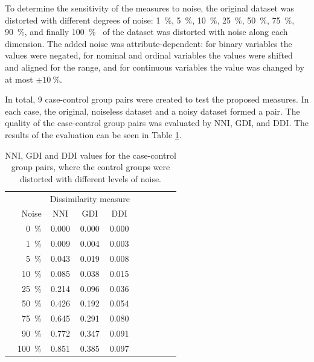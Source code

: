 	To determine the sensitivity of the measures to noise, the original dataset was distorted with different degrees of noise: \SI{1}{\percent}, \SI{5}{\percent}, \SI{10}{\percent}, \SI{25}{\percent}, \SI{50}{\percent}, \SI{75}{\percent}, \SI{90}{\percent},  and finally \SI{100}{\percent} \ of the dataset was distorted with noise along each dimension. The added noise was attribute-dependent: for binary variables the values were negated, for nominal and ordinal variables the values were shifted and aligned for the range, and for continuous variables the value was changed by at most $\pm\SI{10}{\percent}$.
				
	In total, 9 case-control group pairs were created to test the proposed measures. In each case, the original, noiseless dataset and a noisy dataset formed a pair. The quality of the case-control group pairs was evaluated by NNI, GDI, and DDI. The results of the evaluation can be seen in Table \ref{tab:result1}.
				
	\begin{table}[h]
		\centering
		\caption{NNI, GDI and DDI values for the case-control group pairs, where the control groups were distorted with different levels of noise.}\label{tab:result1}
		\bgroup
		\def\arraystretch{1.4}
		\begin{tabular}{cr|cccccccc} \toprule
			& & \multicolumn{3}{c}{Dissimilarity measure} \\
			                                               & Noise              & NNI   & GDI   & DDI   \\ \bottomrule
			\multirow{9}{*}{\rotatebox{90}{Noisy control}} & \SI{0}{\percent}   & 0.000 & 0.000 & 0.000 \\
			                                               & \SI{1}{\percent}   & 0.009 & 0.004 & 0.003 \\
			                                               & \SI{5}{\percent}   & 0.043 & 0.019 & 0.008 \\
			                                               & \SI{10}{\percent}  & 0.085 & 0.038 & 0.015 \\
			                                               & \SI{25}{\percent}  & 0.214 & 0.096 & 0.036 \\
			                                               & \SI{50}{\percent}  & 0.426 & 0.192 & 0.054 \\
			                                               & \SI{75}{\percent}  & 0.645 & 0.291 & 0.080 \\
			                                               & \SI{90}{\percent}  & 0.772 & 0.347 & 0.091 \\
			                                               & \SI{100}{\percent} & 0.851 & 0.385 & 0.097 \\ \bottomrule
		\end{tabular}
		\egroup
	\end{table}
				
